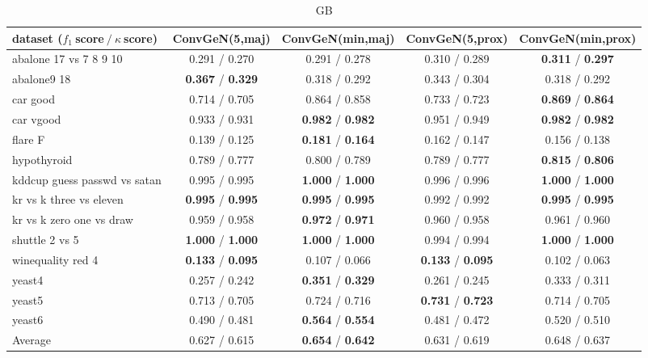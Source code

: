 
\begin{table*}[ht]\scriptsize\caption{GB}\label{tab:results:GB:A}\centering\tabularnewline
\begin{tabular}{l|@{\hskip3pt}c@{\hskip3pt}|@{\hskip3pt}c@{\hskip3pt}|@{\hskip3pt}c@{\hskip3pt}|@{\hskip3pt}c@{\hskip3pt}}\hline
\textbf{dataset ($f_1~$score$~/~\kappa~$score)} & \textbf{ConvGeN(5,maj)} & \textbf{ConvGeN(min,maj)} & \textbf{ConvGeN(5,prox)} & \textbf{ConvGeN(min,prox)}
\tabularnewline
\hline
abalone 17 vs 7 8 9 10 &  0.291  /  0.270  &  0.291  /  0.278  &  0.310  /  0.289  &  \textbf{0.311}  /  \textbf{0.297} 
\tabularnewline
abalone9 18 &  \textbf{0.367}  /  \textbf{0.329}  &  0.318  /  0.292  &  0.343  /  0.304  &  0.318  /  0.292 
\tabularnewline
car good &  0.714  /  0.705  &  0.864  /  0.858  &  0.733  /  0.723  &  \textbf{0.869}  /  \textbf{0.864} 
\tabularnewline
car vgood &  0.933  /  0.931  &  \textbf{0.982}  /  \textbf{0.982}  &  0.951  /  0.949  &  \textbf{0.982}  /  \textbf{0.982} 
\tabularnewline
flare F &  0.139  /  0.125  &  \textbf{0.181}  /  \textbf{0.164}  &  0.162  /  0.147  &  0.156  /  0.138 
\tabularnewline
hypothyroid &  0.789  /  0.777  &  0.800  /  0.789  &  0.789  /  0.777  &  \textbf{0.815}  /  \textbf{0.806} 
\tabularnewline
kddcup guess passwd vs satan &  0.995  /  0.995  &  \textbf{1.000}  /  \textbf{1.000}  &  0.996  /  0.996  &  \textbf{1.000}  /  \textbf{1.000} 
\tabularnewline
kr vs k three vs eleven &  \textbf{0.995}  /  \textbf{0.995}  &  \textbf{0.995}  /  \textbf{0.995}  &  0.992  /  0.992  &  \textbf{0.995}  /  \textbf{0.995} 
\tabularnewline
kr vs k zero one vs draw &  0.959  /  0.958  &  \textbf{0.972}  /  \textbf{0.971}  &  0.960  /  0.958  &  0.961  /  0.960 
\tabularnewline
shuttle 2 vs 5 &  \textbf{1.000}  /  \textbf{1.000}  &  \textbf{1.000}  /  \textbf{1.000}  &  0.994  /  0.994  &  \textbf{1.000}  /  \textbf{1.000} 
\tabularnewline
winequality red 4 &  \textbf{0.133}  /  \textbf{0.095}  &  0.107  /  0.066  &  \textbf{0.133}  /  \textbf{0.095}  &  0.102  /  0.063 
\tabularnewline
yeast4 &  0.257  /  0.242  &  \textbf{0.351}  /  \textbf{0.329}  &  0.261  /  0.245  &  0.333  /  0.311 
\tabularnewline
yeast5 &  0.713  /  0.705  &  0.724  /  0.716  &  \textbf{0.731}  /  \textbf{0.723}  &  0.714  /  0.705 
\tabularnewline
yeast6 &  0.490  /  0.481  &  \textbf{0.564}  /  \textbf{0.554}  &  0.481  /  0.472  &  0.520  /  0.510 
\tabularnewline
\hline Average &  0.627  /  0.615  &  \textbf{0.654}  /  \textbf{0.642}  &  0.631  /  0.619  &  0.648  /  0.637 
\tabularnewline
\hline\end{tabular}\end{table*}


